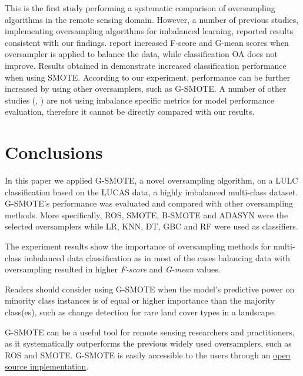 \documentclass[remotesensing,article,submit,moreauthors,pdftex]{Definitions/mdpi}
\begin{document}
This is the first study performing a systematic comparison of oversampling 
algorithms in the remote sensing domain. However, a number of previous studies, 
implementing oversampling algorithms for imbalanced learning, reported results 
consistent with our findings. \cite{Bogner2018} report increased F-score and 
G-mean scores when oversampler is applied to balance the data, while 
classification OA does not improve. Results obtained in \cite{Feng2019} 
demonstrate increased classification performance when using SMOTE. According to 
our experiment, performance can be further increased by using other 
oversamplers, such as G-SMOTE. A number of other studies (\cite{Cenggoro2018}, 
\cite{Maxwell2018}) are not using imbalance specific metrics for model 
performance evaluation, therefore it cannot be directly compared with our 
results. 

\section{Conclusions}

In this paper we applied G-SMOTE, a novel oversampling algorithm, on a LULC
classification based on the LUCAS data, a highly imbalanced multi-class dataset.
G-SMOTE's performance was evaluated and compared with other oversampling
methods. More specifically, ROS, SMOTE, B-SMOTE and ADASYN were the selected
oversamplers while LR, KNN, DT, GBC and RF were used as classifiers.

The experiment results show the importance of oversampling methods for
multi-class imbalanced data classification as in most of the cases balancing
data with oversampling resulted in higher \textit{F-score} and \textit{G-mean}
values.

Readers should consider using G-SMOTE when the model’s predictive power on
minority class instances is of equal or higher importance than the majority
class(es), such as change detection for rare land cover types in a landscape.

G-SMOTE can be a useful tool for remote sensing researchers and practitioners,
as it systematically outperforms the previous widely used oversamplers, such as
ROS and SMOTE. G-SMOTE is easily accessible to the users through an
\href{https://geometric-smote.readthedocs.io/en/latest/?badge=latest}{open
	source implementation}.

\vspace{6pt}

\end{document}
